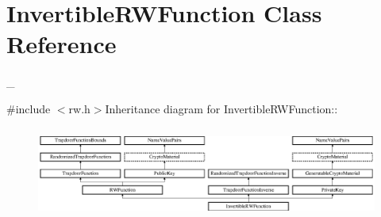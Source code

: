 \hypertarget{class_invertible_r_w_function}{
\section{InvertibleRWFunction Class Reference}
\label{class_invertible_r_w_function}
}


\_\-  


{\ttfamily \#include $<$rw.h$>$}Inheritance diagram for InvertibleRWFunction::\begin{figure}[H]
\begin{center}
\leavevmode
\includegraphics[height=3.0303cm]{class_invertible_r_w_function}
\end{center}
\end{figure}
